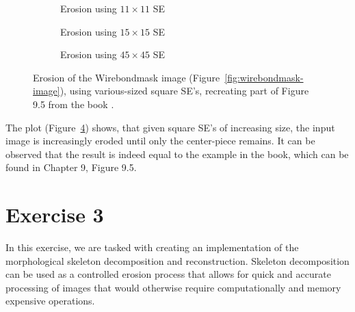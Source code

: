\documentclass{article}
\begin{document}
\begin{figure}[H]
     \centering
     \begin{subfigure}[b]{0.3\textwidth}
         \centering
         
         \caption{Erosion using $11 \times 11$ SE}
         \label{fig:book9.5figure-wirebondmask-image-11x11}
     \end{subfigure}
     \hfill
     \begin{subfigure}[b]{0.3\textwidth}
         \centering
         
         \caption{Erosion using $15 \times 15$ SE}
         \label{fig:book9.5figure-wirebondmask-image-15x15}
     \end{subfigure}
     \hfill
     \begin{subfigure}[b]{0.3\textwidth}
         \centering
         
         \caption{Erosion using $45 \times 45$ SE}
         \label{fig:book9.5figure-wirebondmask-image-45x45}
     \end{subfigure}
     
    \caption{Erosion of the Wirebondmask image (Figure~\ref{fig:wirebondmask-image}), using various-sized square SE's, recreating part of Figure 9.5 from the book \citep{gonzalez2008digital}.}
    \label{fig:book9.5figure}
\end{figure}

The plot (Figure~\ref{fig:book9.5figure}) shows, that given square SE's of increasing size, the input image is increasingly eroded until only the center-piece remains. It can be observed that the result is indeed equal to the example in the book, which can be found in Chapter 9, Figure 9.5.
 
\newpage
\section*{Exercise 3}
In this exercise, we are tasked with creating an implementation of the morphological skeleton decomposition and reconstruction. Skeleton decomposition can be used as a controlled erosion process that allows for quick and accurate processing of images that would otherwise require computationally and memory expensive operations.
\end{document}
